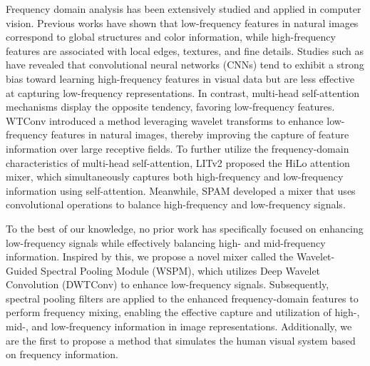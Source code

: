 Frequency domain analysis has been extensively studied and applied in computer vision. Previous works \cite{Frequency_related_1,Frequency_related_2} have shown that low-frequency features in natural images correspond to global structures and color information, while high-frequency features are associated with local edges, textures, and fine details. Studies such as \cite{Frequency_related_3,Frequency_related_4} have revealed that convolutional neural networks (CNNs) tend to exhibit a strong bias toward learning high-frequency features in visual data but are less effective at capturing low-frequency representations. In contrast, multi-head self-attention mechanisms display the opposite tendency, favoring low-frequency features.
WTConv \cite{Frequency_related_7} introduced a method leveraging wavelet transforms to enhance low-frequency features in natural images, thereby improving the capture of feature information over large receptive fields. To further utilize the frequency-domain characteristics of multi-head self-attention, LITv2 \cite{Frequency_related_5} proposed the HiLo attention mixer, which simultaneously captures both high-frequency and low-frequency information using self-attention. Meanwhile, SPAM \cite{SPANet} developed a mixer that uses convolutional operations to balance high-frequency and low-frequency signals.



To the best of our knowledge, no prior work has specifically focused on enhancing low-frequency signals while effectively balancing high- and mid-frequency information. Inspired by this, we propose a novel mixer called the Wavelet-Guided Spectral Pooling Module (WSPM), which utilizes Deep Wavelet Convolution (DWTConv) to enhance low-frequency signals. Subsequently, spectral pooling filters are applied to the enhanced frequency-domain features to perform frequency mixing, enabling the effective capture and utilization of high-, mid-, and low-frequency information in image representations. Additionally, we are the first to propose a method that simulates the human visual system based on frequency information.